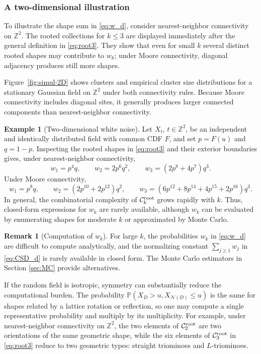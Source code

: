 \documentclass[aap,preprint]{imsart}
\theoremstyle{plain}
\theoremstyle{definition}
\newtheorem{example}[theorem]{Example}
\newtheorem{remark}[theorem]{Remark}
\def\P{{\mathbb P}}
\def\Z{{\mathbb Z}}
\begin{document}
	\subsubsection{A two-dimensional illustration}
	
	To illustrate the shape sum in \eqref{eq:w_d}, consider nearest-neighbor
	connectivity on $\Z^2$.  The rooted collections for $k\leq3$ are displayed
	immediately after the general definition in \eqref{eq:root3}.  They show that
	even for small $k$ several distinct rooted shapes may contribute to $w_k$;
	under Moore connectivity, diagonal adjacency produces still more shapes.
	
	Figure~\ref{fig:simul-2D} shows clusters and empirical cluster size
	distributions for a stationary Gaussian field on $\Z^2$ under both
	connectivity rules.  Because Moore connectivity includes diagonal sites, it
	generally produces larger connected components than nearest-neighbor
	connectivity.
	
	
	\begin{example}[Two-dimensional white noise]\label{example:WNF}
		Let $X_t$, $t\in\Z^2$, be an independent and identically distributed field
		with common CDF $F$, and set $p=F(u)$ and $q=1-p$.  Inspecting the rooted
		shapes in \eqref{eq:root3} and their exterior boundaries gives, under
		nearest-neighbor connectivity,
		\[
		w_1=p^4q,\qquad
		w_2=2p^6q^2,\qquad
		w_3=(2p^8+4p^7)q^3.
		\]
		Under Moore connectivity,
		\[
		w_1=p^8q,\qquad
		w_2=(2p^{10}+2p^{12})q^2,\qquad
		w_3=(6p^{12}+8p^{14}+4p^{15}+2p^{16})q^3.
		\]
		In general, the combinatorial complexity of
		$\mathcal{C}_k^{\rm root}$ grows rapidly with $k$.  Thus, closed-form
		expressions for $w_k$ are rarely available, although $w_k$ can be evaluated
		by enumerating shapes for moderate $k$ or approximated by Monte Carlo.
	\end{example}
	
	\begin{remark}[Computation of $w_k$]
		For large $k$, the probabilities $w_k$ in \eqref{eq:w_d} are difficult to
		compute analytically, and the normalizing constant
		$\sum_{j\ge1}w_j$ in \eqref{eq:CSD_d} is rarely available in closed form.
		The Monte Carlo estimators in Section \ref{sec:MC} provide alternatives.
		
		If the random field is isotropic, symmetry can substantially reduce the
		computational burden.  The probability
		$\P(X_D>u,X_{\mathcal{N}(D)}\le u)$ is the same for shapes related by a
		lattice rotation or reflection, so one may compute a single representative
		probability and multiply by its multiplicity.  For example, under
		nearest-neighbor connectivity on $\Z^2$, the two elements of
		$\mathcal{C}_2^{\rm root}$ are two orientations of the same geometric
		shape, while the six elements of $\mathcal{C}_3^{\rm root}$ in
		\eqref{eq:root3} reduce to two geometric types: straight triominoes and
		$L$-triominoes.
	\end{remark}
	
\end{document}
